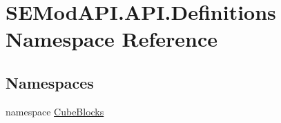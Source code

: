 \hypertarget{namespace_s_e_mod_a_p_i_1_1_a_p_i_1_1_definitions}{}\section{S\+E\+Mod\+A\+P\+I.\+A\+P\+I.\+Definitions Namespace Reference}
\label{namespace_s_e_mod_a_p_i_1_1_a_p_i_1_1_definitions}
\subsection*{Namespaces}
\begin{DoxyCompactItemize}
\item 
namespace \hyperlink{namespace_s_e_mod_a_p_i_1_1_a_p_i_1_1_definitions_1_1_cube_blocks}{Cube\+Blocks}
\end{DoxyCompactItemize}
